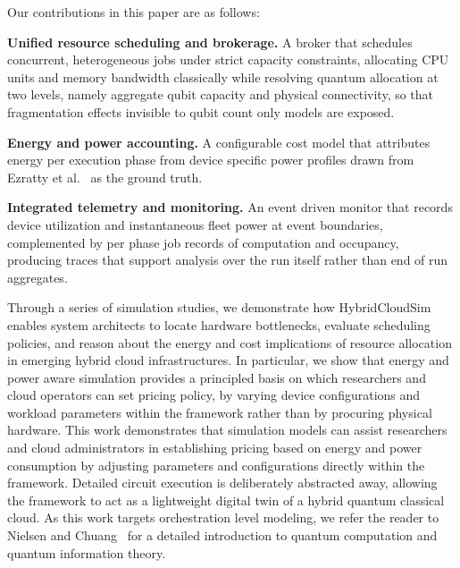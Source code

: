 Our contributions in this paper are as follows:

\textbf{Unified resource scheduling and brokerage.} A broker that schedules concurrent, heterogeneous jobs under strict capacity constraints, allocating CPU units and memory bandwidth classically while resolving quantum allocation at two levels, namely aggregate qubit capacity and physical connectivity, so that fragmentation effects invisible to qubit count only models are exposed.

\textbf{Energy and power accounting.} A configurable cost model that attributes energy per execution phase from device specific power profiles drawn from Ezratty et al.~\cite{ezratty2021} as the ground truth.

\textbf{Integrated telemetry and monitoring.} An event driven monitor that records device utilization and instantaneous fleet power at event boundaries, complemented by per phase job records of computation and occupancy, producing traces that support analysis over the run itself rather than end of run aggregates.

Through a series of simulation studies, we demonstrate how HybridCloudSim enables system architects to locate hardware bottlenecks, evaluate scheduling policies, and reason about the energy and cost implications of resource allocation in emerging hybrid cloud infrastructures. In particular, we show that energy and power aware simulation provides a principled basis on which researchers and cloud operators can set pricing policy, by varying device configurations and workload parameters within the framework rather than by procuring physical hardware. This work demonstrates that simulation models can assist researchers and cloud administrators in establishing pricing based on energy and power consumption by adjusting parameters and configurations directly within the framework. Detailed circuit execution is deliberately abstracted away, allowing the framework to act as a lightweight digital twin of a hybrid quantum classical cloud. As this work targets orchestration level modeling, we refer the reader to Nielsen and Chuang~\cite{nielsen2010quantum} for a detailed introduction to quantum computation and quantum information theory.
